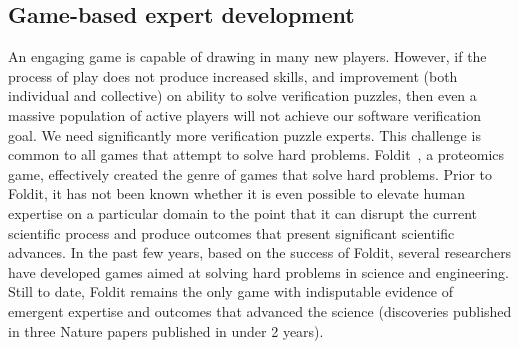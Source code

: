 \documentclass{sig-alternate}
\begin{document}
% 
% 


\subsection{Game-based expert development}
 
An engaging game is capable of drawing in many new
players.  However, if the process of play does not produce increased
skills, and improvement (both individual and collective) on ability to
solve verification puzzles, then even a massive population of active
players will not achieve our software verification goal.
We need significantly more verification puzzle experts.
This challenge is common to all games
that attempt to solve hard problems.  Foldit~\cite{cooper10challenge,cooper11analysis}, a proteomics game,
effectively created the genre of games that solve hard problems.
Prior to Foldit, it has not been known whether it is even possible to
elevate human expertise on a particular domain to the point that it
can disrupt the current scientific process and produce outcomes that
present significant scientific advances.  In the past few years, based
on the success of Foldit, several researchers have developed games
aimed at solving hard problems in science and engineering.  Still to
date, Foldit remains the only game with indisputable evidence
of emergent expertise and outcomes that advanced the science
(discoveries published in three Nature papers published in under 2
years).
 
\end{document}
